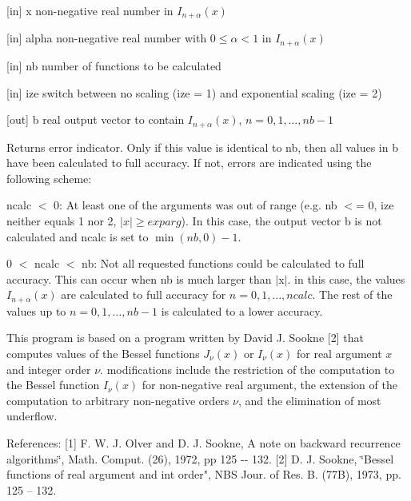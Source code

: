 \begin{DoxyItemize}
\item \mbox{[}in\mbox{]} {\ttfamily x} non-\/negative real number in $I_{n+\alpha}(x)$ \item \mbox{[}in\mbox{]} {\ttfamily alpha} non-\/negative real number with $0 \le \alpha < 1$ in $I_{n+\alpha}(x)$ \item \mbox{[}in\mbox{]} {\ttfamily nb} number of functions to be calculated \item \mbox{[}in\mbox{]} {\ttfamily ize} switch between no scaling ({\ttfamily ize} = 1) and exponential scaling ({\ttfamily ize} = 2) \item \mbox{[}out\mbox{]} {\ttfamily b} real output vector to contain $I_{n+\alpha}(x)$, $n=0,1,\ldots,nb-1$ \begin{DoxyReturn}{Returns}
error indicator. Only if this value is identical to {\ttfamily nb}, then all values in {\ttfamily b} have been calculated to full accuracy. If not, errors are indicated using the following scheme\-:
\begin{DoxyItemize}
\item ncalc $<$ 0\-: At least one of the arguments was out of range (e.\-g. nb $<$= 0, ize neither equals 1 nor 2, $|x| \ge exparg$). In this case, the output vector b is not calculated and {\ttfamily ncalc} is set to $\min(nb,0)-1$.
\item 0 $<$ ncalc $<$ nb\-: Not all requested functions could be calculated to full accuracy. This can occur when nb is much larger than $\vert$x$\vert$. in this case, the values $I_{n+\alpha}(x)$ are calculated to full accuracy for $n=0,1,\ldots,ncalc$. The rest of the values up to $n=0,1,\ldots,nb-1$ is calculated to a lower accuracy.
\end{DoxyItemize}
\end{DoxyReturn}
\end{DoxyItemize}
This program is based on a program written by David J. Sookne \mbox{[}2\mbox{]} that computes values of the Bessel functions $J_{\nu}(x)$ or $I_{\nu}(x)$ for real argument $x$ and integer order $\nu$. modifications include the restriction of the computation to the Bessel function $I_{\nu}(x)$ for non-\/negative real argument, the extension of the computation to arbitrary non-\/negative orders $\nu$, and the elimination of most underflow.

References\-: \mbox{[}1\mbox{]} F. W. J. Olver and D. J. Sookne, A note on backward recurrence algorithms\char`\"{}, Math. Comput. (26), 1972, pp 125 -\/-\/ 132.
\mbox{[}2\mbox{]} D. J. Sookne, \char`\"{}Bessel functions of real argument and int order", N\-B\-S Jour. of Res. B. (77\-B), 1973, pp. 125 -- 132.

